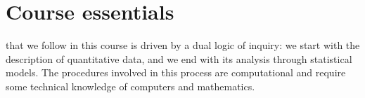 %
%
\section{Course essentials}%
	\label{sec:topic}%

	 that we follow in this course is driven by a dual logic of inquiry: we start with the description of quantitative data, and we end with its analysis through statistical models. The procedures involved in this process are computational and require some technical knowledge of computers and mathematics.%






	





